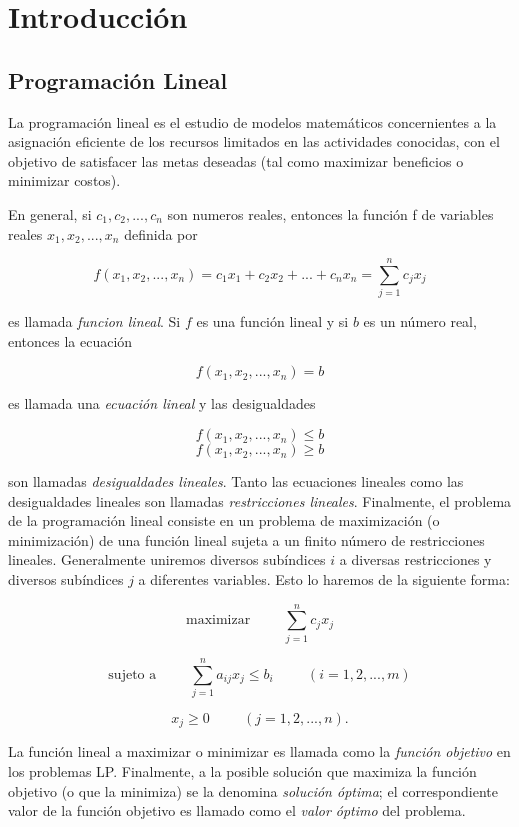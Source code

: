 \section{Introducci\'on}

\subsection{Programaci\'on Lineal}

La programaci\'on lineal es el estudio de modelos matem\'aticos concernientes a la asignaci\'on eficiente de los recursos limitados en las actividades conocidas, con el objetivo de satisfacer las metas deseadas (tal como maximizar beneficios o minimizar costos).

En general, si $c_1, c_2, ..., c_n$ son numeros reales, entonces la funci\'on f de variables reales $x_1, x_2, ..., x_n$ definida por 

$$ f(x_1, x_2, ..., x_n) = c_1x_1 + c_2x_2 + ... + c_nx_n = \sum_{j=1}^n c_jx_j$$

es llamada \emph{funcion lineal}. Si $f$ es una funci\'on lineal y si $b$ es un n\'umero real, entonces la ecuaci\'on

$$f(x_1, x_2, ..., x_n) = b$$

es llamada una \emph{ecuaci\'on lineal} y las desigualdades 

$$f(x_1, x_2, ..., x_n)  \leq b$$
$$f(x_1, x_2, ..., x_n)  \geq b$$

son llamadas \emph{desigualdades lineales}. Tanto las ecuaciones lineales como las desigualdades lineales son llamadas \emph{restricciones lineales}. Finalmente, el problema de la programaci\'on lineal consiste en un problema de maximizaci\'on (o minimizaci\'on) de una funci\'on lineal sujeta a un finito n\'umero de restricciones lineales. Generalmente uniremos diversos sub\'indices $i$ a diversas restricciones  y diversos sub\'indices $j$ a diferentes variables. Esto lo haremos de la siguiente forma:

$$\mbox{maximizar}  \hspace{1cm}   \sum_{j=1}^n c_jx_j $$

$$\mbox{sujeto  a} \hspace{1cm} \sum_{j=1}^n a_{ij}x_j \leq b_i \hspace{1cm} (i = 1,2,...,m)$$

$$x_j \geq 0  \hspace{1cm} (j = 1,2,...,n).$$


La funci\'on lineal a maximizar o minimizar es llamada como la \emph{funci\'on objetivo} en los problemas LP. Finalmente, a la posible soluci\'on que maximiza la funci\'on objetivo (o que la minimiza) se la denomina \emph{soluci\'on \'optima}; el correspondiente valor de la funci\'on objetivo es llamado como el \emph{valor \'optimo} del problema.

